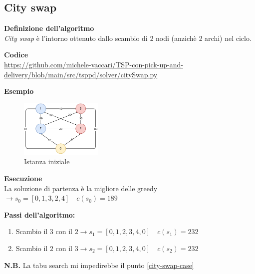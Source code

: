 \documentclass[9pt]{beamer}
\begin{document}
\subsection{City swap}
\begin{frame}{\subsecname}
	\textbf{Definizione dell'algoritmo} \\
	\emph{City swap} è l’intorno ottenuto dallo scambio di 2 nodi (anzichè 2 archi) nel ciclo.

	\textbf{Codice} \\
	\href{https://github.com/michele-vaccari/TSP-con-pick-up-and-delivery/blob/main/src/tsppd/solver/citySwap.py}{https://github.com/michele-vaccari/TSP-con-pick-up-and-delivery/blob/main/src/tsppd/solver/citySwap.py}

	\textbf{Esempio}
	\begin{figure}[h]
	\centering
	\includegraphics[width=0.35\textwidth]
	{../images/graph-tsppd-with-two-customers}	
	\caption{Istanza iniziale}
	\end{figure}

\framebreak
	{\footnotesize
	\textbf{Esecuzione} \\
	La soluzione di partenza è la migliore delle greedy $\rightarrow s_0 = [0,1,3,2,4] \quad c(s_0) = 189$

	\textbf{Passi dell’algoritmo:}
	\begin{enumerate}
		\item
		Scambio il $3$ con il $2 \rightarrow s_1 = [0,1,2,3,4,0] \quad c(s_1) = 232$

		\item
		\label{city-swap-case}
		Scambio il $2$ con il $3 \rightarrow s_2 = [0,1,2,3,4,0] \quad c(s_2) = 232$
	\end{enumerate}
	\textbf{N.B.} La tabu search mi impedirebbe il punto \ref{city-swap-case}

	\captionsetup{justification=centering,font=footnotesize}

}
\end{frame}
\end{document}
